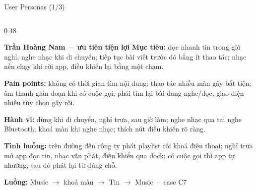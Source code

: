 \documentclass[aspectratio=169]{beamer}
\begin{document}
\begin{frame}{User Personas (1/3)}
\begin{columns}
\begin{column}{0.48\textwidth}
\begin{block}{\scriptsize\bfseries Trần Hoàng Nam~--~ưu tiên tiện lợi}
        {\tiny\textbf{Mục tiêu:} đọc nhanh tin trong giờ nghỉ; nghe nhạc khi di chuyển; tiếp tục bài viết trước đó bằng ít thao tác; nhạc nền chạy khi rời app, điều khiển lại bằng một chạm.}\par\vspace{0.3mm}
        {\tiny\textbf{Pain points:} không có thời gian tìm nội dung; thao tác nhiều màn gây bất tiện; âm thanh gián đoạn khi có cuộc gọi; phải tìm lại bài đang nghe/đọc; giao diện nhiều tùy chọn gây rối.}\par\vspace{0.3mm}
        {\tiny\textbf{Hành vi:} dùng khi di chuyển, nghỉ trưa, sau giờ làm; nghe nhạc qua tai nghe Bluetooth; khoá màn khi nghe nhạc; thích nút điều khiển rõ ràng.}\par\vspace{0.3mm}
        {\tiny\textbf{Tình huống:} trên đường đến công ty phát playlist rồi khoá điện thoại; nghỉ trưa mở app đọc tin, nhạc vẫn phát, điều khiển qua dock; có cuộc gọi thì app tự nhường, sau đó phát lại từ đúng chỗ.}\par\vspace{0.3mm}
        {\tiny\textbf{Luồng:} \textcolor{brandteal!60!black}{Music $\rightarrow$ khoá màn $\rightarrow$ Tin $\rightarrow$ Music}~--~case C7}
      \end{block}
    \end{column}
  \end{columns}
\end{frame}
\end{document}

